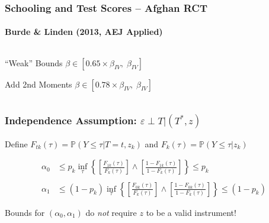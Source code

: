 \documentclass{beamer}
\begin{document}
\begin{frame}[c]
  \frametitle{Schooling and Test Scores -- Afghan RCT}
  \framesubtitle{Burde \& Linden (2013, AEJ Applied)}
\begin{columns}[c]
  \begin{column}{0.4\textwidth}
    \begin{block}{``Weak'' Bounds}
      $\beta \in [0.65 \times\beta_{IV},\; \beta_{IV}]$
    \end{block}
    \vspace{1em}
    \begin{alertblock}{Add 2nd Moments}
      $\beta \in [0.78 \times \beta_{IV},\;\beta_{IV}]$
    \end{alertblock}
  \end{column}
  \begin{column}{0.6\textwidth}
      \begin{figure}[h]
        \centering
      \end{figure}
  \end{column}
\end{columns}
 
\end{frame}
\begin{frame}
  \frametitle{Independence Assumption: $\varepsilon \perp T |(T^*,z)$}
  Define $F_{tk}(\tau) = \mathbb{P}(Y \leq \tau|T=t, z_k)$ and $F_k(\tau) = \mathbb{P}(Y \leq \tau|z_k)$

\begin{align*}
  \alpha_0 &\leq p_k \inf_\tau\left\{\left[\frac{F_{1k}(\tau)}{F_k(\tau)}\right] \wedge \left[\frac{1-F_{1k}(\tau)}{1 - F_k(\tau)} \right]\right\} \leq p_k \\ \\
  \alpha_1 &\leq (1 - p_k) \inf_\tau \left\{\left[\frac{F_{0k}(\tau)}{F_k(\tau)}\right] \wedge \left[\frac{1-F_{0k}(\tau)}{1 - F_k(\tau)} \right]\right\} \leq (1 - p_k) 
\end{align*}

\vspace{1em}
\alert{Bounds for $(\alpha_0, \alpha_1)$ do \emph{not} require $z$ to be a valid instrument!}
\end{frame}
\end{document}
